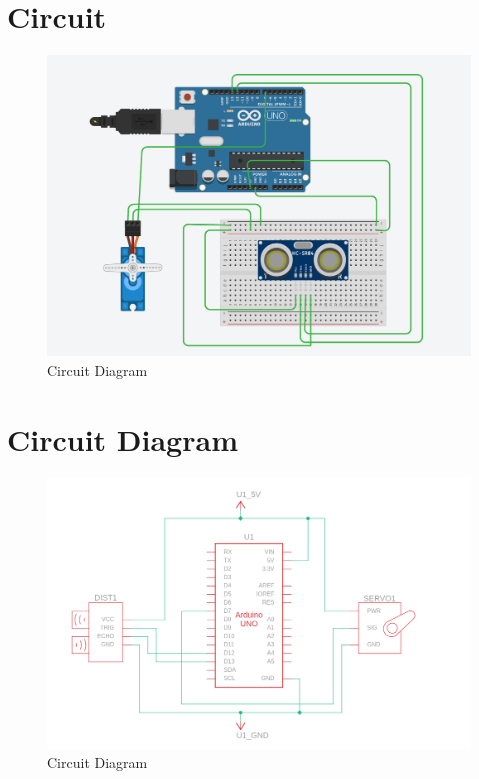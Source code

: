 \documentclass[11pt]{article}
\begin{document}
\section{Circuit}
\begin{figure}[H]
	\centering
	\includegraphics[width=.95\textwidth]{Screenshot_on_2023-05-01_at_23-47-24.png}
	\caption{Circuit Diagram}
\end{figure}

\section{Circuit Diagram}
\begin{figure}[H]
	\centering
	\includegraphics[width=.95\textwidth]{Screenshot_on_2023-05-01_at_23-52-00.png}
	\caption{Circuit Diagram}
\end{figure}
\end{document}
